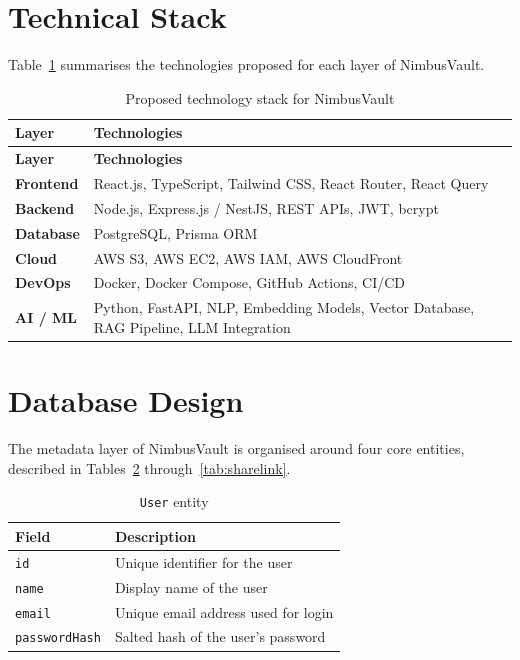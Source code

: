 \documentclass{tietreport}
\begin{document}
\section{Technical Stack}

Table~\ref{tab:techstack} summarises the technologies proposed for each layer of NimbusVault.

\begin{longtable}{@{}>{\bfseries}p{3.4cm} p{10.6cm}@{}}
\caption{Proposed technology stack for NimbusVault} \label{tab:techstack} \\
\toprule
\textbf{Layer} & \textbf{Technologies} \\
\midrule
\endfirsthead
\toprule
\textbf{Layer} & \textbf{Technologies} \\
\midrule
\endhead
Frontend & React.js, TypeScript, Tailwind CSS, React Router, React Query \\
\midrule
Backend & Node.js, Express.js / NestJS, REST APIs, JWT, bcrypt \\
\midrule
Database & PostgreSQL, Prisma ORM \\
\midrule
Cloud & AWS S3, AWS EC2, AWS IAM, AWS CloudFront \\
\midrule
DevOps & Docker, Docker Compose, GitHub Actions, CI/CD \\
\midrule
AI / ML & Python, FastAPI, NLP, Embedding Models, Vector Database, RAG Pipeline, LLM Integration \\
\bottomrule
\end{longtable}
\section{Database Design}

The metadata layer of NimbusVault is organised around four core entities, described in Tables~\ref{tab:user} through~\ref{tab:sharelink}.

\begin{table}[h!]
\centering
\begin{tabular}{@{}p{3.2cm}p{9.6cm}@{}}
\toprule
\textbf{Field} & \textbf{Description} \\
\midrule
\texttt{id} & Unique identifier for the user \\
\texttt{name} & Display name of the user \\
\texttt{email} & Unique email address used for login \\
\texttt{passwordHash} & Salted hash of the user's password \\
\bottomrule
\end{tabular}
\caption{\texttt{User} entity}
\label{tab:user}
\end{table}
\end{document}
